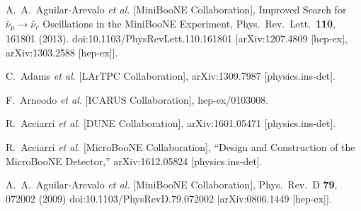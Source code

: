 \documentclass[a4paper,11pt]{article}
\begin{document}
\clearpage
\begin{thebibliography}{99}




  A.~A.~Aguilar-Arevalo {\it et al.} 
  [MiniBooNE Collaboration],
  Improved Search for $\bar \nu_\mu \rightarrow \bar \nu_e$ Oscillations in the MiniBooNE Experiment,
  Phys.\ Rev.\ Lett.\  {\bf 110}, 161801 (2013).
  doi:10.1103/PhysRevLett.110.161801
  [arXiv:1207.4809 [hep-ex], arXiv:1303.2588 [hep-ex]].

  C.~Adams {\it et al.} [LArTPC Collaboration],
  arXiv:1309.7987 [physics.ins-det].

  F.~Arneodo {\it et al.} [ICARUS Collaboration],
  hep-ex/0103008.

  R.~Acciarri {\it et al.} [DUNE Collaboration],
  arXiv:1601.05471 [physics.ins-det].

  R.~Acciarri {\it et al.} [MicroBooNE Collaboration],
  ``Design and Construction of the MicroBooNE Detector,''
  arXiv:1612.05824 [physics.ins-det].

  A.~A.~Aguilar-Arevalo {\it et al.} [MiniBooNE Collaboration],
  Phys.\ Rev.\ D {\bf 79}, 072002 (2009)
  doi:10.1103/PhysRevD.79.072002
  [arXiv:0806.1449 [hep-ex]].


\end{thebibliography}
\end{document}
